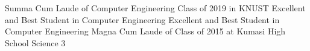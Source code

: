 %
%
%


\begin{scholarship}
					{Summa Cum Laude of Computer Engineering Class of 2019 in KNUST}
					{Excellent and Best Student in Computer Engineering}
					{Excellent and Best Student in Computer Engineering}
					{Magna Cum Laude of Class of 2015 at Kumasi High School Science 3}
\end{scholarship}

